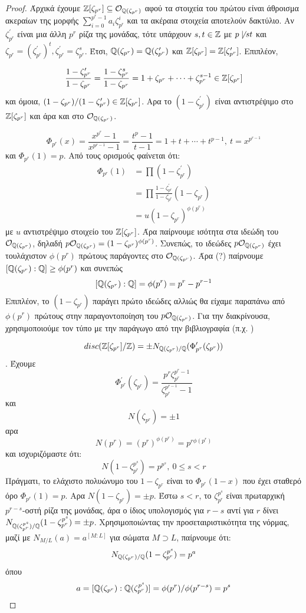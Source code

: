 \documentclass{report}
\begin{document}
\begin{proof}
	Άρχικά έχουμε $\mathbb{Z}[\zeta_{p^r}]\subseteq \mathcal{O}_{\mathbb{Q}(\zeta_{p^r})}$ αφού τα στοιχεία του πρώτου είναι άθροισμα ακεραίων της μορφής $\sum\limits_{i=0}^{p^r-1} a_i \zeta_{p^r}^i$ και τα ακέραια στοιχεία αποτελούν δακτύλιο.
	Αν $\zeta_{p^r}^{\prime}$ είναι μια άλλη $p^r$ ρίζα της μονάδας, τότε υπάρχουν $s,t\in\mathbb{Z}$ με $p\not\mid st$ και $\zeta_{p^r} = (\zeta_{p^r}^{\prime})^t, \zeta_{p^r}^{\prime} = \zeta_{p^r}^s$. Έτσι, $\mathbb{Q}(\zeta_{p^r}) = \mathbb{Q}(\zeta_{p^r}^{\prime})$ και $\mathbb{Z}[\zeta_{p^r}] = \mathbb{Z}[\zeta_{p^r}^{\prime}]$. Επιπλέον,
	
	$$\frac{1-\zeta^{\prime}_{p^r}}{1-\zeta_{p^r}} = \frac{1-\zeta^s_{p^r}}{1-\zeta_{p^r}} = 1 + \zeta_{p^r} + \cdots + \zeta_{p^r}^{s-1} \in \mathbb{Z}[\zeta_{p^r}]$$ και όμοια, $(1-\zeta_{p^r})/(1-\zeta_{p^r}^{\prime}) \in \mathbb{Z}[\zeta_{p^r}]$. Αρα το $(1-\zeta^{\prime}_{p^r})$ είναι αντιστρέψιμο στο $\mathbb{Z}[\zeta_{p^r}]$ και άρα και στο $\mathcal{O}_{\mathbb{Q}(\zeta_{p^r})}$.

	$$\Phi_{p^r} (x) = \frac{x^{p^r}-1}{x^{p^{r-1}}-1} = \frac{t^p - 1}{t-1} = 1+t+\cdots + t^{p-1}, \ t = x^{p^{r-1}}$$ και $\Phi_{p^r}(1) = p$. Από τους ορισμούς φαίνεται ότι:
	\begin{align*}
		\Phi_{p^r}(1) &= \prod (1-\zeta^{\prime}_{p^r}) \\
		&= \prod \frac{1-\zeta^{\prime}_{p^r}}{1-\zeta_{p^r}}(1-\zeta_{p^r}) \\
		&= u (1-\zeta_{p^r})^{\phi(p^r)} 
	\end{align*}
	με $u$ αντιστρέψιμο στοιχείο του $\mathbb{Z}[\zeta_{p^r}]$. Άρα παίρνουμε ισότητα στα ιδεώδη του $\mathcal{O}_{\mathbb{Q}(\zeta_{p^r})}$, δηλαδή $p\mathcal{O}_{\mathbb{Q}(\zeta_{p^r})} = (1-\zeta_{p^r})^{\phi(p^r)}$. Συνεπώς, το ιδεώδες $p\mathcal{O}_{\mathbb{Q}(\zeta_{p^r})}$ έχει τουλάχιστον $\phi(p^r)$ πρώτους παράγοντες στο $\mathcal{O}_{\mathbb{Q}(\zeta_{p^r})}$. Άρα (?) παίρνουμε $[\mathbb{Q}(\zeta_{p^r}):\mathbb{Q}] \geq \phi(p^r)$ και συνεπώς 
	$$[\mathbb{Q}(\zeta_{p^r}):\mathbb{Q}] = \phi(p^r) = p^r - p^{r-1}$$
	Επιπλέον, το $(1-\zeta_{p^r})$ παράγει πρώτο ιδεώδες αλλιώς θα είχαμε παραπάνω από $\phi(p^r)$ πρώτους στην παραγοντοποίηση του $p\mathcal{O}_{\mathbb{Q}(\zeta_{p^r})}$. Για την διακρίνουσα, χρησιμοποιούμε τον τύπο με την παράγωγο από την βιβλιογραφία (π.χ. )
	
	$$disc(\mathbb{Z}[\zeta_{p^r}]/\mathbb{Z}) = \pm N_{\mathbb{Q}(\zeta_{p^r})/\mathbb{Q}} (\Phi^{\prime}_{p^r}(\zeta_{p^r}))$$. Έχουμε
	$$\Phi^{\prime}_{p^r}(\zeta_{p^r}) = \frac{p^r \zeta_{p^r}^{p^r-1}}{\zeta_{p^r}^{p^{r-1}}-1}$$ και
	$$N(\zeta_{p^r}) = \pm 1$$ αρα
	$$N(p^r) = (p^r)^{\phi(p^r)} = p^{r\phi(p^r)}$$ και ισχυριζόμαστε ότι:
	$$N(1-\zeta_{p^r}^{p^s}) = p^{p^s}, \ 0\leq s < r$$
	Πράγματι, το ελάχιστο πολυώνυμο του $1-\zeta_{p^r}$ είναι το $\Phi_{p^r}(1-x)$ που έχει σταθερό όρο $\Phi_{p^r}(1) = p$. Αρα $N(1-\zeta_{p^r})= \pm p$. Έστω $s<r$, το $\zeta_{p^r}^{p^s}$ είναι πρωταρχική $p^{r-s}$-οστή ρίζα της μονάδας, άρα ο ίδιος υπολογισμός για $r-s$ αντί για $r$ δίνει $N_{\mathbb{Q}(\zeta_{p^r}^{p^s})/\mathbb{Q}}(1-\zeta^{p^s}_{p^r}) = \pm p$. Χρησιμοποιώντας την προσεταιριστικότητα  της νόρμας, μαζί με $N_{M/L}(a) = a^{[M:L]}$ για σώματα $M\supset L$, παίρνουμε ότι:
	$$N_{\mathbb{Q}(\zeta_{p^r})/\mathbb{Q}} (1-\zeta^{p^s}_{p^r}) = p^a$$ όπου
	$$a = [\mathbb{Q}(\zeta_{p^r}):\mathbb{Q}(\zeta^{p^s}_{p^r})] = \phi(p^r)/\phi(p^{r-s}) = p^s$$


\end{proof}
\end{document}
